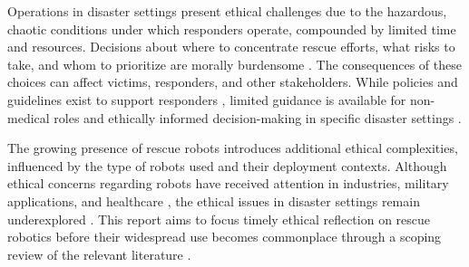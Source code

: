 Operations in disaster settings present ethical challenges due to the hazardous, chaotic conditions under which responders operate, compounded by limited time and resources. Decisions about where to concentrate rescue efforts, what risks to take, and whom to prioritize are morally burdensome \cite{gustavsson2020}. The consequences of these choices can affect victims, responders, and other stakeholders. While policies and guidelines exist to support responders \cite{world2015, international2012}, limited guidance is available for non-medical roles and ethically informed decision-making in specific disaster settings \cite{gustavsson2020}. 

The growing presence of rescue robots introduces additional ethical complexities, influenced by the type of robots used and their deployment contexts. Although ethical concerns regarding robots have received attention in industries, military applications, and healthcare \cite{lichoki2011}, the ethical issues in disaster settings remain underexplored \cite{harbers2017}. This report aims to focus timely ethical reflection on rescue robotics before their widespread use becomes commonplace through a scoping review of the relevant literature \cite{battistuzzi2021}.
